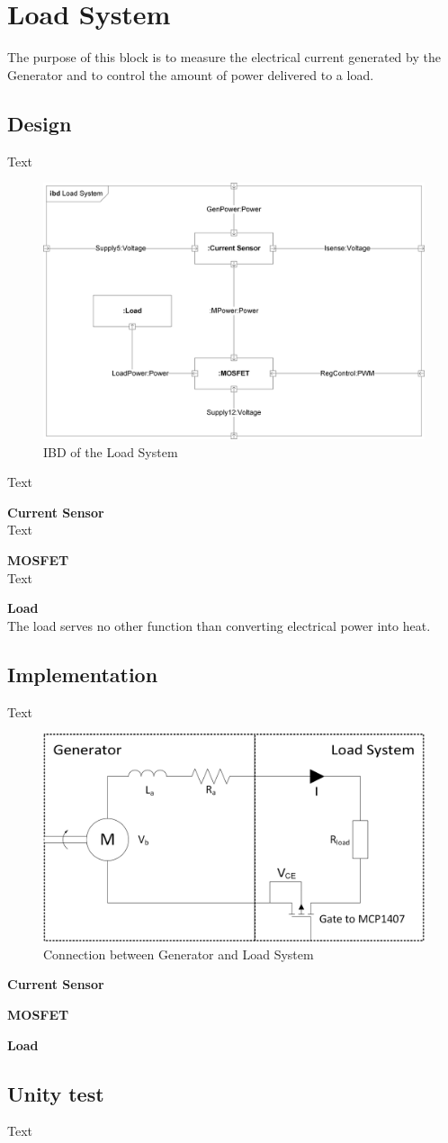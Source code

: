 \section{Load System}
The purpose of this block is to measure the electrical current generated by the Generator and to control the amount of power delivered to a load.

\subsection{Design}
Text

\begin{figure}[H]
	\centering
	\includegraphics[width=0.7\linewidth]{Hardware/Pictures/IBD_LoadSystem}
	\caption{IBD of the Load System}
	\label{fig:IBD_Load_System}
\end{figure}

Text

\textbf{Current Sensor}\\
Text

\textbf{MOSFET}\\
Text

\textbf{Load}\\
The load serves no other function than converting electrical power into heat.

\subsection{Implementation}
Text

\begin{figure}[H]
	\centering
	\includegraphics[width=0.7\linewidth]{Hardware/Pictures/LoadSystem}
	\caption{Connection between Generator and Load System}
	\label{fig:Load_System}
\end{figure}

\textbf{Current Sensor}

\textbf{MOSFET}

\textbf{Load}

\subsection{Unity test}
Text